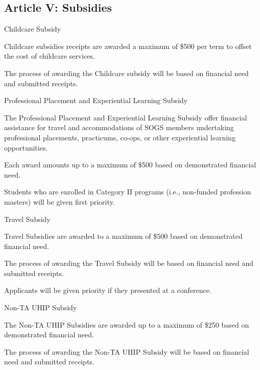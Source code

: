 \subsection{Article V: Subsidies}
\begin{longenum}[ label*=\thesubsection.\arabic*., align=left]
	\item Childcare Subsidy
		\begin{longenum}[ label*=\arabic*., align=left]	
		\item Childcare subsidies receipts are awarded a maximum of \$500 per term to offset the cost of childcare services.
		\item The process of awarding the Childcare subsidy will be based on financial need and submitted receipts.
		\end{longenum}
	\item Professional Placement and Experiential Learning Subsidy
		\begin{longenum}[ label*=\arabic*., align=left]	
		\item The Professional Placement and Experiential Learning Subsidy offer financial assistance for travel and accommodations of SOGS members undertaking professional placements, practicums, co-ops, or other experiential learning opportunities. 
		\item Each award amounts up to a maximum of \$500 based on demonstrated financial need.
		\item Students who are enrolled in Category II programs (i.e., non-funded profession masters) will be given first priority.
		\end{longenum}
	\item Travel Subsidy
		\begin{longenum}[ label*=\arabic*., align=left]	
		\item Travel Subsidies are awarded to a maximum of \$500 based on demonstrated financial need.
		\item The process of awarding the Travel Subsidy will be based on financial need and submitted receipts.
		\item Applicants will be given priority if they presented at a conference.
		\end{longenum}
	\item Non-TA UHIP Subsidy
		\begin{longenum}[ label*=\arabic*., align=left]	
		\item The Non-TA UHIP Subsidies are awarded up to a maximum of \$250 based on demonstrated financial need.
		\item The process of awarding the Non-TA UHIP Subsidy will be based on financial need and submitted receipts.	

\end{longenum}
\end{longenum}
